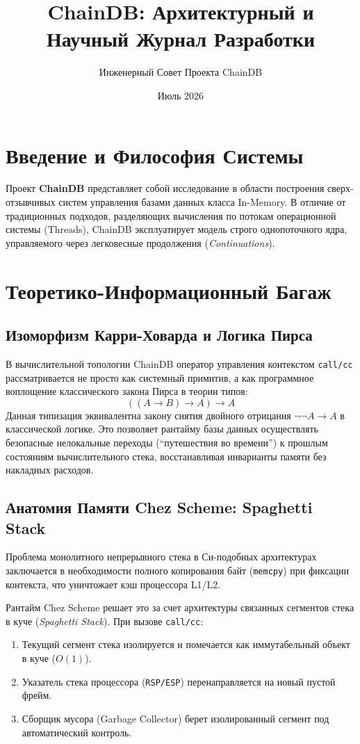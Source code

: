 \documentclass[12pt,a4paper]{article}
\title{\textbf{ChainDB: Архитектурный и Научный Журнал Разработки}}
\author{Инженерный Совет Проекта ChainDB}
\date{Июль 2026}
\begin{document}
\maketitle
\tableofcontents
\newpage

\section{Введение и Философия Системы}
Проект \textbf{ChainDB} представляет собой исследование в области построения сверх-отзывчивых систем управления базами данных класса In-Memory. В отличие от традиционных подходов, разделяющих вычисления по потокам операционной системы (Threads), ChainDB эксплуатирует модель строго однопоточного ядра, управляемого через легковесные продолжения (\textit{Continuations}).

\section{Теоретико-Информационный Багаж}
\subsection{Изоморфизм Карри-Ховарда и Логика Пирса}
В вычислительной топологии ChainDB оператор управления контекстом \texttt{call/cc} рассматривается не просто как системный примитив, а как программное воплощение классического закона Пирса в теории типов:
\begin{equation}
((A \to B) \to A) \to A
\end{equation}
Данная типизация эквивалентна закону снятия двойного отрицания $\neg\neg A \to A$ в классической логике. Это позволяет рантайму базы данных осуществлять безопасные нелокальные переходы (``путешествия во времени'') к прошлым состояниям вычислительного стека, восстанавливая инварианты памяти без накладных расходов.

\subsection{Анатомия Памяти Chez Scheme: Spaghetti Stack}
Проблема монолитного непрерывного стека в Си-подобных архитектурах заключается в необходимости полного копирования байт (\texttt{memcpy}) при фиксации контекста, что уничтожает кэш процессора L1/L2.

Рантайм Chez Scheme решает это за счет архитектуры связанных сегментов стека в куче (\textit{Spaghetti Stack}). При вызове \texttt{call/cc}:
\begin{enumerate}
    \item Текущий сегмент стека изолируется и помечается как иммутабельный объект в куче ($O(1)$).
    \item Указатель стека процессора (\texttt{RSP/ESP}) перенаправляется на новый пустой фрейм.
    \item Сборщик мусора (Garbage Collector) берет изолированный сегмент под автоматический контроль.
\end{enumerate}
\end{document}
